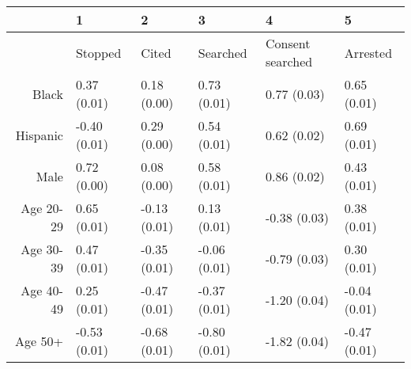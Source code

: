 \begin{table}[ht]
\centering
\begin{tabular}{rlllll}
  \hline
 & 1 & 2 & 3 & 4 & 5 \\ 
  \hline
 & Stopped & Cited & Searched & Consent searched & Arrested \\ 
  Black & 0.37 (0.01) & 0.18 (0.00) & 0.73 (0.01) & 0.77 (0.03) & 0.65 (0.01) \\ 
  Hispanic & -0.40 (0.01) & 0.29 (0.00) & 0.54 (0.01) & 0.62 (0.02) & 0.69 (0.01) \\ 
  Male & 0.72 (0.00) & 0.08 (0.00) & 0.58 (0.01) & 0.86 (0.02) & 0.43 (0.01) \\ 
  Age 20-29 & 0.65 (0.01) & -0.13 (0.01) & 0.13 (0.01) & -0.38 (0.03) & 0.38 (0.01) \\ 
  Age 30-39 & 0.47 (0.01) & -0.35 (0.01) & -0.06 (0.01) & -0.79 (0.03) & 0.30 (0.01) \\ 
  Age 40-49 & 0.25 (0.01) & -0.47 (0.01) & -0.37 (0.01) & -1.20 (0.04) & -0.04 (0.01) \\ 
  Age 50+ & -0.53 (0.01) & -0.68 (0.01) & -0.80 (0.01) & -1.82 (0.04) & -0.47 (0.01) \\ 
   \hline
\end{tabular}
\end{table}
